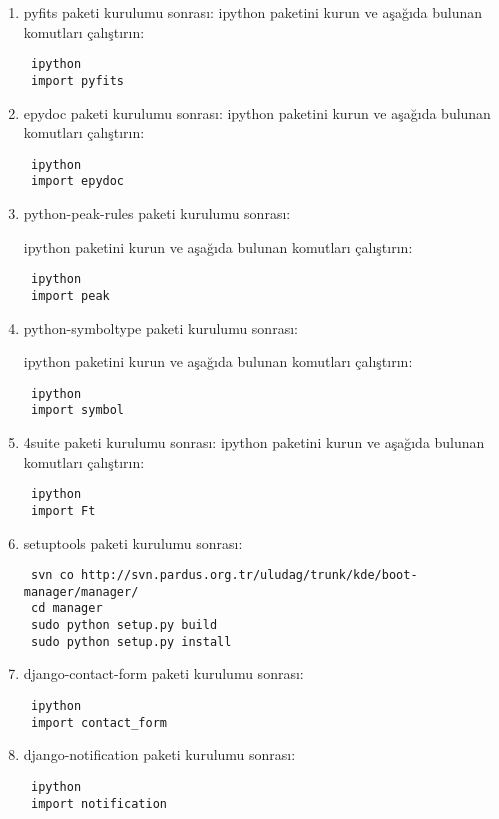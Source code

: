 \documentclass[a4paper,10pt]{article}
\begin{document}
\begin{enumerate}
\item pyfits paketi kurulumu sonrası:
ipython paketini kurun ve aşağıda bulunan komutları çalıştırın:
\begin{verbatim}
 ipython
 import pyfits
\end{verbatim}


\item epydoc paketi kurulumu sonrası:
ipython paketini kurun ve aşağıda bulunan komutları çalıştırın:
\begin{verbatim}
 ipython
 import epydoc
\end{verbatim}

\item python-peak-rules paketi kurulumu sonrası:

ipython paketini kurun ve aşağıda bulunan komutları çalıştırın:
\begin{verbatim}
 ipython
 import peak
\end{verbatim}

\item python-symboltype paketi kurulumu sonrası:

ipython paketini kurun ve aşağıda bulunan komutları çalıştırın:
\begin{verbatim}
 ipython
 import symbol
\end{verbatim}

\item 4suite paketi kurulumu sonrası:
ipython paketini kurun ve aşağıda bulunan komutları çalıştırın:
\begin{verbatim}
 ipython
 import Ft
\end{verbatim}


\item setuptools paketi kurulumu sonrası:
\begin{verbatim}
 svn co http://svn.pardus.org.tr/uludag/trunk/kde/boot-manager/manager/
 cd manager
 sudo python setup.py build 
 sudo python setup.py install
\end{verbatim}
\item django-contact-form paketi kurulumu sonrası:

\begin{verbatim}
 ipython
 import contact_form
\end{verbatim}

\item django-notification paketi kurulumu sonrası:

\begin{verbatim}
 ipython
 import notification
\end{verbatim}


\end{enumerate}
\end{document}

